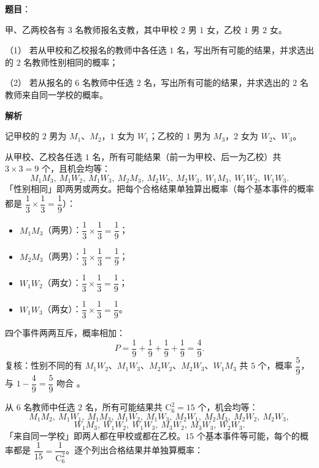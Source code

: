 \begin{answer}

\textbf{题目}：

甲、乙两校各有 $3$ 名教师报名支教，其中甲校 $2$ 男 $1$ 女，乙校 $1$ 男 $2$ 女。

（1） 若从甲校和乙校报名的教师中各任选 $1$ 名，写出所有可能的结果，并求选出的 $2$ 名教师性别相同的概率；

（2） 若从报名的 $6$ 名教师中任选 $2$ 名，写出所有可能的结果，并求选出的 $2$ 名教师来自同一学校的概率。

\textbf{解析}

记甲校的 $2$ 男为 $M_1$、$M_2$，$1$ 女为 $W_1$；乙校的 $1$ 男为 $M_3$，$2$ 女为 $W_2$、$W_3$。


从甲校、乙校各任选 $1$ 名，所有可能结果（前一为甲校、后一为乙校）共 $3\times3=9$ 个，且机会均等：
\nopagebreak[4]
\[
M_1M_3,\ M_1W_2,\ M_1W_3,\ M_2M_3,\ M_2W_2,\ M_2W_3,\ W_1M_3,\ W_1W_2,\ W_1W_3.
\]
「性别相同」即两男或两女。把每个合格结果单独算出概率（每个基本事件的概率都是 $\dfrac13\times\dfrac13=\dfrac19$）：

\begin{itemize}
\item $M_1M_3$（两男）：$\dfrac13\times\dfrac13=\dfrac19$；
\item $M_2M_3$（两男）：$\dfrac13\times\dfrac13=\dfrac19$；
\item $W_1W_2$（两女）：$\dfrac13\times\dfrac13=\dfrac19$；
\item $W_1W_3$（两女）：$\dfrac13\times\dfrac13=\dfrac19$。
\end{itemize}

四个事件两两互斥，概率相加：
\nopagebreak[4]
\[
P=\frac19+\frac19+\frac19+\frac19=\frac49.
\]
复核：性别不同的有 $M_1W_2$、$M_1W_3$、$M_2W_2$、$M_2W_3$、$W_1M_3$ 共 $5$ 个，概率 $\dfrac59$，与 $1-\dfrac49=\dfrac59$ 吻合 。


从 $6$ 名教师中任选 $2$ 名，所有可能结果共 $\mathrm C_6^2=15$ 个，机会均等：
\nopagebreak[4]
\[
M_1M_2,\ M_1W_1,\ M_1M_3,\ M_1W_2,\ M_1W_3,\ M_2W_1,\ M_2M_3,\ M_2W_2,\ M_2W_3,
\]
\nopagebreak[4]
\[
W_1M_3,\ W_1W_2,\ W_1W_3,\ M_3W_2,\ M_3W_3,\ W_2W_3.
\]
「来自同一学校」即两人都在甲校或都在乙校。$15$ 个基本事件等可能，每个的概率都是 $\dfrac1{15}=\dfrac{1}{\mathrm C_6^2}$。逐个列出合格结果并单独算概率：


\end{answer}
